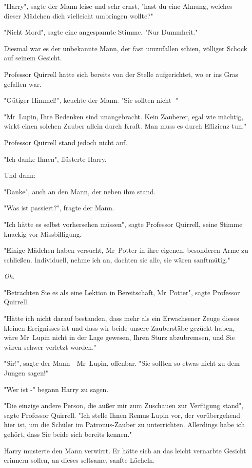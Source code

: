 {"Harry", sagte der Mann leise und sehr ernst, "hast du eine Ahnung, welches dieser Mädchen dich vielleicht umbringen wollte?"

"Nicht Mord", sagte eine angespannte Stimme. "Nur Dummheit."

Diesmal war es der unbekannte Mann, der fast umzufallen schien, völliger Schock auf seinem Gesicht.

Professor Quirrell hatte sich bereits von der Stelle aufgerichtet, wo er ins Gras gefallen war.

"Gütiger Himmel!", keuchte der Mann. "Sie sollten nicht -"

"Mr~Lupin, Ihre Bedenken sind unangebracht. Kein Zauberer, egal wie mächtig, wirkt einen solchen Zauber allein durch Kraft. Man muss es durch Effizienz tun."

Professor Quirrell stand jedoch nicht auf.

"Ich danke Ihnen", flüsterte Harry.

Und dann:

"Danke", auch an den Mann, der neben ihm stand.

"Was ist passiert?", fragte der Mann.

"Ich hätte es selbst vorhersehen müssen", sagte Professor Quirrell, seine Stimme knackig vor Missbilligung.

"Einige Mädchen haben versucht, Mr~Potter in ihre eigenen, besonderen Arme zu schließen. Individuell, nehme ich an, dachten sie alle, sie wären sanftmütig."

\emph{Oh}.

"Betrachten Sie es als eine Lektion in Bereitschaft, Mr~Potter", sagte Professor Quirrell.

"Hätte ich nicht darauf bestanden, dass mehr als ein Erwachsener Zeuge dieses kleinen Ereignisses ist und dass wir beide unsere Zauberstäbe gezückt haben, wäre Mr~Lupin nicht in der Lage gewesen, Ihren Sturz abzubremsen, und Sie wären schwer verletzt worden."

"Sir!", sagte der Mann - Mr~Lupin, offenbar. "Sie sollten so etwas nicht zu dem Jungen sagen!"

"Wer ist -" begann Harry zu sagen.

"Die einzige andere Person, die außer mir zum Zuschauen zur Verfügung stand", sagte Professor Quirrell. "Ich stelle Ihnen Remus Lupin vor, der vorübergehend hier ist, um die Schüler im Patronus-Zauber zu unterrichten. Allerdings habe ich gehört, dass Sie beide sich bereits kennen."

Harry musterte den Mann verwirrt. Er hätte sich an das leicht vernarbte Gesicht erinnern sollen, an dieses seltsame, sanfte Lächeln.

}
